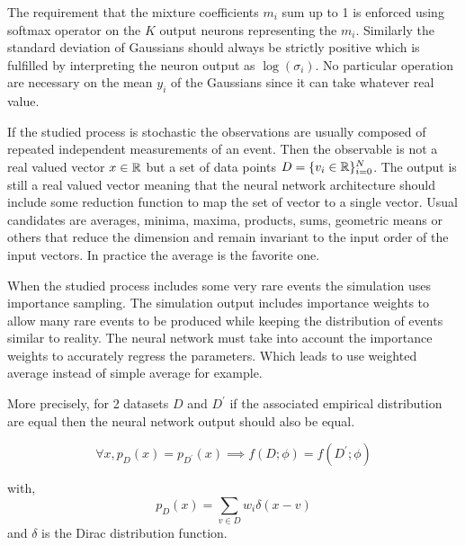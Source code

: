The requirement that the mixture coefficients $m_i$ sum up to 1 is enforced using softmax operator on the $K$ output neurons representing the $m_i$.
Similarly the standard deviation of Gaussians should always be strictly positive which is fulfilled by interpreting the neuron output as $\log(\sigma_i)$.
No particular operation are necessary on the mean $y_i$ of the Gaussians since it can take whatever real value.

If the studied process is stochastic the observations are usually composed of repeated independent measurements of an event.
Then the observable is not a real valued vector $x \in \mathbb{R}$ but a set of data points $D = \{v_i \in \mathbb{R} \}_{i=0}^N$.
The output is still a real valued vector meaning that the neural network architecture should include some reduction function to map the set of vector to a single vector.
Usual candidates are averages, minima, maxima, products, sums, geometric means or others that reduce the dimension and remain invariant to the input order of the input vectors.
In practice the average is the favorite one.

When the studied process includes some very rare events the simulation uses importance sampling. 
The simulation output includes importance weights to allow many rare events to be produced while keeping the distribution of events similar to reality.
The neural network must take into account the importance weights to accurately regress the parameters.
Which leads to use weighted average instead of simple average for example.

More precisely, for 2 datasets $D$ and $D^\prime$ if the associated empirical distribution are equal then the neural network output should also be equal.

\begin{equation}
    \forall x, p_D(x) = p_{D^\prime}(x) \implies f(D; \phi) = f(D^\prime; \phi)
\end{equation}

with,
\begin{equation}
    p_D(x) = \sum_{v \in D} w_i \delta (x - v)
\end{equation}
and $\delta$ is the Dirac distribution function.




